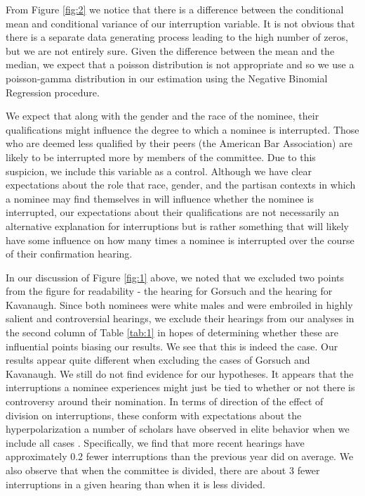 \documentclass [12pt]{article}
\begin{document}
From Figure \ref{fig:2} we notice that there is a difference between the conditional mean and conditional variance of our interruption variable. It is not obvious that there is a separate data generating process leading to the high number of zeros, but we are not entirely sure. Given the difference between the mean and the median, we expect that a poisson distribution is not appropriate and so we use a poisson-gamma distribution in our estimation using the Negative Binomial Regression procedure.

We expect that along with the gender and the race of the nominee, their qualifications might influence the degree to which a nominee is interrupted. Those who are deemed less qualified by their peers (the American Bar Association) are likely to be interrupted more by members of the committee. Due to this suspicion, we include this variable as a control. Although we have clear expectations about the role that race, gender, and the partisan contexts in which a nominee may find themselves in will influence whether the nominee is interrupted, our expectations about their qualifications are not necessarily an alternative explanation for interruptions but is rather something that will likely have some influence on how many times a nominee is interrupted over the course of their confirmation hearing.	    
	    


In our discussion of Figure \ref{fig:1} above, we noted that we excluded two points from the figure for readability - the hearing for Gorsuch and the hearing for Kavanaugh. Since both nominees were white males and were embroiled in highly salient and controversial hearings, we exclude their hearings from our analyses in the second column of Table \ref{tab:1} in hopes of determining whether these are influential points biasing our results. We see that this is indeed the case. Our results appear quite different when excluding the cases of Gorsuch and Kavanaugh. We still do not find evidence for our hypotheses. It appears that the interruptions a nominee experiences might just be tied to whether or not there is controversy around their nomination. In terms of direction of the effect of division on interruptions, these conform with expectations about the hyperpolarization a number of scholars have observed in elite behavior when we include all cases \citep{McCarty, Ramey2017, Enders2020a}. Specifically, we find that more recent hearings have approximately 0.2 fewer interruptions than the previous year did on average. We also observe that when the committee is divided, there are about 3 fewer interruptions in a given hearing than when it is less divided. 
	    
\end{document}
